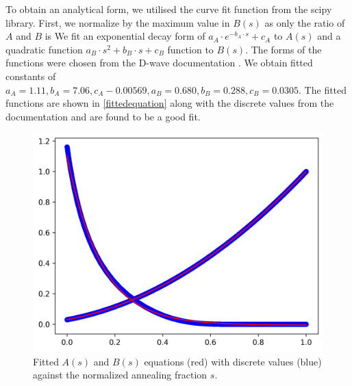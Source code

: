 To obtain an analytical form, we utilised the curve fit function from the scipy library. First, we normalize by the maximum value in $B(s)$ as only the ratio of $A$ and $B$ is We fit an exponential decay form of $a_{A}\cdot e^{-b_{A}\cdot s} + c_{A}$ to $A(s)$ and a quadratic function $a_{B} \cdot s^2 + b_{B} \cdot s + c_{B}$ function to $B(s)$. The forms of the functions were chosen from the D-wave documentation \cite{dwavefunctions}. We obtain fitted constants of $a_{A}=1.11, b_{A} = 7.06, c_A-0.00569, a_B = 0.680, b_B = 0.288, c_B = 0.0305$. The fitted functions are shown in \autoref{fittedequation} along with the discrete values from the documentation and are found to be a good fit.
\begin{figure}[!h]
    \centering
    \includegraphics[width=0.8\linewidth]{images/fitted.png}
    \caption{Fitted $A(s)$ and $B(s)$ equations (red) with discrete values (blue) against the normalized annealing fraction $s$.}
    \label{fittedequation}
\end{figure}